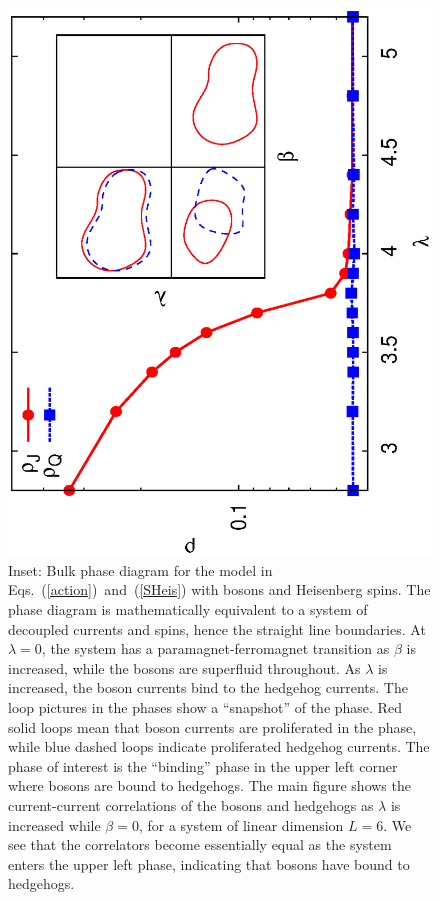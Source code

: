 \begin{figure}
\includegraphics[angle=-90,width=\linewidth]{figures/heisbulkout.eps}
\caption{Inset: Bulk phase diagram for the model in Eqs.~(\ref{action})~and~(\ref{SHeis}) with bosons and Heisenberg spins. The phase diagram is mathematically equivalent to a system of decoupled currents and spins, hence the straight line boundaries. At $\lambda=0$, the system has a paramagnet-ferromagnet transition as $\beta$ is increased, while the bosons are superfluid throughout. As $\lambda$ is increased, the boson currents bind to the hedgehog currents. The loop pictures in the phases show a ``snapshot'' of the phase. Red solid loops mean that boson currents are proliferated in the phase, while blue dashed loops indicate proliferated hedgehog currents. The phase of interest is the ``binding'' phase in the upper left corner where bosons are bound to hedgehogs. The main figure shows the current-current correlations of the bosons and hedgehogs as $\lambda$ is increased while $\beta=0$, for a system of linear dimension $L=6$. We see that the correlators become essentially equal as the system enters the upper left phase, indicating that bosons have bound to hedgehogs.}
\label{heisbulk}
\end{figure}


